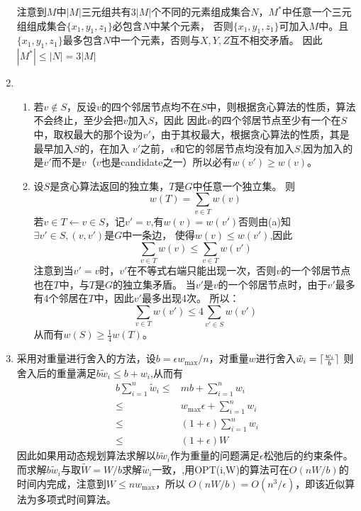 \documentclass[a4paper]{article}
\DeclarePairedDelimiter{\ceil}{\lceil}{\rceil}
\begin{document}
\begin{enumerate}[label=\arabic*.]
  注意到$M$中$|M|$三元组共有$3|M|$个不同的元素组成集合$N$，$M^*$中任意一个三元组组成集合$\{x_1,y_1,z_1\}$必包含$N$中某个元素，
  否则$\{x_1,y_1,z_1\}$可加入$M$中。且$\{x_1,y_1,z_1\}$最多包含$N$中一个元素，否则与$X,Y,Z$互不相交矛盾。
  因此$|M^*|\leq |N|= 3|M|$
  \setcounter{enumi}{9}
  \item
    \begin{enumerate}[label=(\alph*)]
    \item 若$v\not\in S$，反设$v$的四个邻居节点均不在$S$中，则根据贪心算法的性质，算法不会终止，至少会把$v$加入$S$，因此
    因此$v$的四个邻居节点至少有一个在$S$中，取权最大的那个设为$v'$，由于其权最大，根据贪心算法的性质，其是最早加入$S$的，在加入
    $v'$之前，$v$和它的邻居节点均没有加入$S$,因为加入的是$v'$而不是$v$（$v$也是candidate之一）所以必有$w(v')\geq w(v)$。
    \item 设$S$是贪心算法返回的独立集，$T$是$G$中任意一个独立集。
    则
    \begin{equation}
            w(T)=\sum_{v\in T}w(v)
    \end{equation}
    若$v\in T \leftarrow v \in S$，记$v'=v$,有$w(v)=w(v')$否则由(a)知$\exists v'\in S, (v,v')$是$G$中一条边，
    使得$w(v)\leq w(v')$,因此
    \begin{equation}
        \sum_{v\in T}w(v)\leq \sum_{v\in T}w(v')
    \end{equation}
    注意到当$v'=v$时，$v'$在不等式右端只能出现一次，否则$v$的一个邻居节点也在$T$中，与$T$是$G$的独立集矛盾。
    当$v'$是$v$的一个邻居节点时，由于$v'$最多有4个邻居在$T$中，因此$v'$最多出现4次。
    所以：
    \begin{equation}
        \sum_{v\in T}w(v')\leq 4\sum_{v' \in S}w(v')
    \end{equation}
    从而有$w(S)\geq \frac{1}{4}w(T)$。
    \end{enumerate}
    
    \item 采用对重量进行舍入的方法，设$b=\epsilon w_{\max}/n$，对重量$w$进行舍入$\tilde{w}_i=\ceil{\frac{w_i}{b}}$
    则舍入后的重量满足$b\tilde{w}_i\leq b+w_i$,从而有
    \begin{align}
        b\sum_{i=1}^n \tilde{w}_i\leq & mb+\sum_{i=1}^n w_i \\
        \leq & w_{\max} \epsilon + \sum_{i=1}^n w_i\\
        \leq & (1+\epsilon)\sum_{i=1}^n w_i\\
        \leq & (1+\epsilon)W
    \end{align}
    因此如果用动态规划算法求解以$b\tilde{w}_i$作为重量的问题满足$\epsilon$松弛后的约束条件。
    而求解$b\tilde{w}_i$与取$\tilde{W}=W/b$求解$\tilde{w}_i$一致，,用OPT(i,W)的算法可在$O(nW/b)$的时间内完成，注意到$W\leq n w_{\max}$，所以
    $O(nW/b)=O(n^3/\epsilon)$，即该近似算法为多项式时间算法。
  \end{enumerate}
\end{document}
